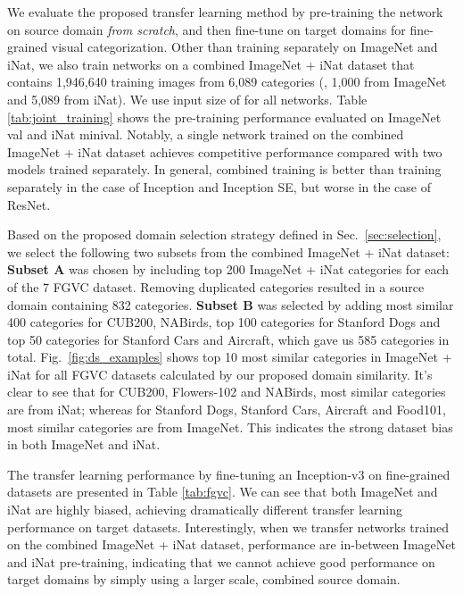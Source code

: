 \documentclass[10pt,twocolumn,letterpaper]{article}
\begin{document}
We evaluate the proposed transfer learning method by pre-training the network on source domain \textit{from scratch}, and then fine-tune on target domains for fine-grained visual categorization.
Other than training separately on ImageNet and iNat, we also train networks on a combined ImageNet + iNat dataset that contains 1,946,640 training images from 6,089 categories (\ie, 1,000 from ImageNet and 5,089 from iNat).
We use input size of  for all networks.
Table \ref{tab:joint_training} shows the pre-training performance evaluated on ImageNet val and iNat minival.
Notably, a single network trained on the combined ImageNet + iNat dataset achieves competitive performance compared with two models trained separately. In general, combined training is better than training separately in the case of Inception and Inception SE, but worse in the case of ResNet.

Based on the proposed domain selection strategy defined in Sec.\ \ref{sec:selection}, we select the following two subsets from the combined ImageNet + iNat dataset:
\textbf{Subset A} was chosen by including top 200 ImageNet + iNat categories for each of the 7 FGVC dataset.
Removing duplicated categories resulted in a source domain containing 832 categories.
\textbf{Subset B} was selected by adding most similar 400 categories for CUB200, NABirds, top 100 categories for Stanford Dogs and top 50 categories for Stanford Cars and Aircraft, which gave us 585 categories in total.
Fig.\ \ref{fig:ds_examples} shows top 10 most similar categories in ImageNet + iNat for all FGVC datasets calculated by our proposed domain similarity.
It's clear to see that for CUB200, Flowers-102 and NABirds, most similar categories are from iNat; whereas for Stanford Dogs, Stanford Cars, Aircraft and Food101, most similar categories are from ImageNet.
This indicates the strong dataset bias in both ImageNet and iNat.

The transfer learning performance by fine-tuning an Inception-v3 on fine-grained datasets are presented in Table \ref{tab:fgvc}.
We can see that both ImageNet and iNat are highly biased, achieving dramatically different transfer learning performance on target datasets.
Interestingly, when we transfer networks trained on the combined ImageNet + iNat dataset, performance are in-between ImageNet and iNat pre-training, indicating that we cannot achieve good performance on target domains by simply using a larger scale, combined source domain.
\end{document}
